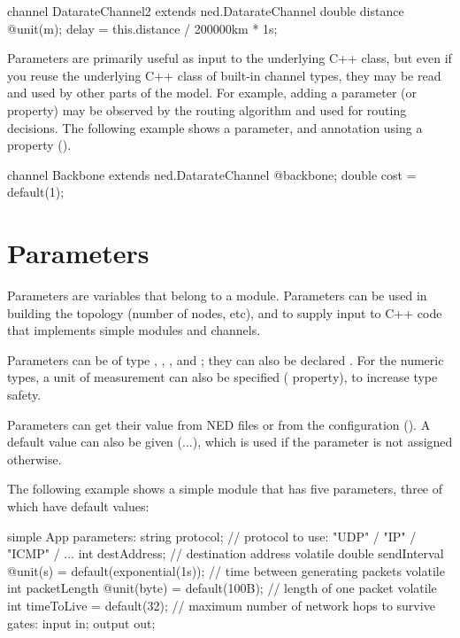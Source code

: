 \begin{ned}
channel DatarateChannel2 extends ned.DatarateChannel
{
    double distance @unit(m);
    delay = this.distance / 200000km * 1s;
}
\end{ned}

Parameters are primarily useful as input to the underlying C++ class, but
even if you reuse the underlying C++ class of built-in channel types, they
may be read and used by other parts of the model. For example, adding a
 parameter (or  property) may be observed by the
routing algorithm and used for routing decisions. The following example
shows a  parameter, and annotation using a property
().

\begin{ned}
channel Backbone extends ned.DatarateChannel
{
    @backbone;
    double cost = default(1);
}
\end{ned}



\section{Parameters}
\label{sec:ned-lang:parameters}

Parameters are variables that belong to a module. Parameters can be
used in building the topology (number of nodes, etc), and to supply
input to C++ code that implements simple modules and channels.

Parameters can be of type , ,
,  and ; they can also
be declared . For the numeric types, a unit of
measurement can also be specified ( property), to increase
type safety.

Parameters can get their value from NED files or from the configuration
(). A default value can also be given (...\ttt{)}),
which is used if the parameter is not assigned otherwise.

The following example shows a simple module that has five parameters, three
of which have default values:

\begin{ned}
simple App
{
    parameters:
        string protocol;       // protocol to use: "UDP" / "IP" / "ICMP" / ...
        int destAddress;       // destination address
        volatile double sendInterval @unit(s) = default(exponential(1s));
                               // time between generating packets
        volatile int packetLength @unit(byte) = default(100B);
                               // length of one packet
        volatile int timeToLive = default(32);
                               // maximum number of network hops to survive
    gates:
        input in;
        output out;
}
\end{ned}


